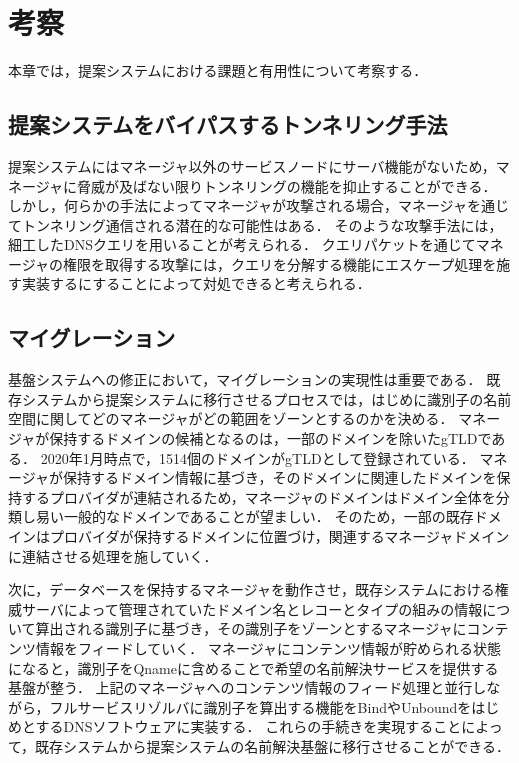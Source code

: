 \section{考察}
本章では，提案システムにおける課題と有用性について考察する．

\subsection{提案システムをバイパスするトンネリング手法}
提案システムにはマネージャ以外のサービスノードにサーバ機能がないため，マネージャに脅威が及ばない限りトンネリングの機能を抑止することができる．
しかし，何らかの手法によってマネージャが攻撃される場合，マネージャを通じてトンネリング通信される潜在的な可能性はある．
そのような攻撃手法には，細工したDNSクエリを用いることが考えられる．
クエリパケットを通じてマネージャの権限を取得する攻撃には，クエリを分解する機能にエスケープ処理を施す実装するにすることによって対処できると考えられる．

\subsection{マイグレーション}
基盤システムへの修正において，マイグレーションの実現性は重要である．
既存システムから提案システムに移行させるプロセスでは，はじめに識別子の名前空間に関してどのマネージャがどの範囲をゾーンとするのかを決める．
マネージャが保持するドメインの候補となるのは，一部のドメインを除いたgTLDである．
2020年1月時点で，1514個のドメインがgTLDとして登録されている．
マネージャが保持するドメイン情報に基づき，そのドメインに関連したドメインを保持するプロバイダが連結されるため，マネージャのドメインはドメイン全体を分類し易い一般的なドメインであることが望ましい．
そのため，一部の既存ドメインはプロバイダが保持するドメインに位置づけ，関連するマネージャドメインに連結させる処理を施していく．

次に，データベースを保持するマネージャを動作させ，既存システムにおける権威サーバによって管理されていたドメイン名とレコーとタイプの組みの情報について算出される識別子に基づき，その識別子をゾーンとするマネージャにコンテンツ情報をフィードしていく．
マネージャにコンテンツ情報が貯められる状態になると，識別子をQnameに含めることで希望の名前解決サービスを提供する基盤が整う．
上記のマネージャへのコンテンツ情報のフィード処理と並行しながら，フルサービスリゾルバに識別子を算出する機能をBindやUnboundをはじめとするDNSソフトウェアに実装する．
これらの手続きを実現することによって，既存システムから提案システムの名前解決基盤に移行させることができる．


